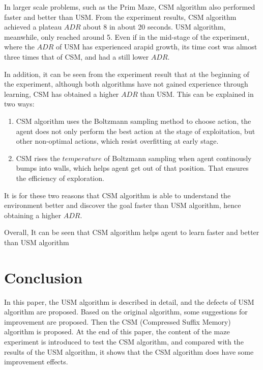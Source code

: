 \documentclass{article}
\begin{document}
In larger scale problems, such as the Prim Maze, CSM algorithm also performed
faster and better than USM. From the experiment results, CSM algorithm achieved a plateau
$ADR$ about 8 in about 20 seconds. USM algorithm, meanwhile, only reached around 5.
Even if in the mid-stage of the experiment, where the $ADR$ of USM has experienced arapid growth,
its time cost was almost three times that of CSM, and had a still lower $ADR$.

In addition, it can be seen from the experiment result that at the beginning of the experiment,
although both algorithms have not gained experience through learning, CSM has obtained a higher
$ADR$ than USM. This can be explained in two ways:
\begin{enumerate}
  \item CSM algorithm uses the Boltzmann sampling method to choose action, the agent does
  not only perform the best action at the stage of exploitation, but  other non-optimal actions,
  which resist overfitting at early stage.
  
  \item CSM rises the $temperature$ of Boltzmann sampling when agent continously bumps into walls,
  which helps agent get out of that position. That ensures the efficiency of exploration.
  
\end{enumerate}
It is for these two reasons that CSM algorithm is able to understand the environment better and
discover the goal faster than USM algorithm, hence obtaining a higher $ADR$.

Overall, It can be seen that CSM algorithm helps agent to learn faster and better than USM algorithm


\section{Conclusion}

In this paper, the USM algorithm is described in detail, and the defects of USM
algorithm are proposed. Based on the original algorithm, some suggestions for improvement
are proposed. Then the CSM (Compressed Suffix Memory) algorithm is proposed. At the end of
this paper, the content of the maze experiment is introduced to test the CSM algorithm, and
compared with the results of the USM algorithm, it shows that the CSM algorithm does have
some improvement effects.


\clearpage
\small


\end{document}
